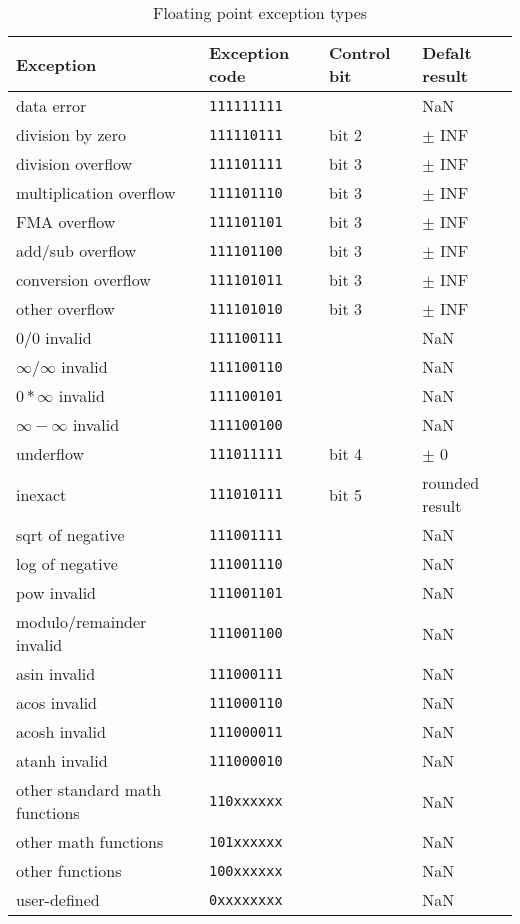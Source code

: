\documentclass[forwardcom.tex]{subfiles}
\begin{document}
\begin{longtable}
{|p{50mm}|p{28mm}|p{15mm}|p{26mm}|}
\caption{Floating point exception types}
\label{table:FPExceptionTypes}
\endfirsthead
\endhead
\hline
\bfseries Exception & \bfseries Exception code & \bfseries Control bit & \bfseries Defalt result \\ \hline

data error                & \texttt{111111111} &       &  NaN \\
division by zero          & \texttt{111110111} & bit 2 & $\pm$ INF \\
division overflow         & \texttt{111101111} & bit 3 & $\pm$ INF \\
multiplication overflow   & \texttt{111101110} & bit 3 & $\pm$ INF \\
FMA overflow              & \texttt{111101101} & bit 3 & $\pm$ INF \\
add/sub overflow          & \texttt{111101100} & bit 3 & $\pm$ INF \\
conversion overflow       & \texttt{111101011} & bit 3 & $\pm$ INF \\
other overflow            & \texttt{111101010} & bit 3 & $\pm$ INF \\
$0 / 0$ invalid           & \texttt{111100111} & & NaN \\
$\infty / \infty$ invalid & \texttt{111100110} & & NaN \\
$0 * \infty$ invalid      & \texttt{111100101} & & NaN \\
$\infty - \infty$ invalid & \texttt{111100100} & & NaN \\
underflow                 & \texttt{111011111} & bit 4 & $\pm$ 0 \\
inexact                   & \texttt{111010111} & bit 5 & rounded result \\
sqrt of negative          & \texttt{111001111} &  & NaN \\
log of negative           & \texttt{111001110} &  & NaN \\
pow invalid               & \texttt{111001101} &  & NaN \\
modulo/remainder invalid  & \texttt{111001100} &  & NaN \\
asin invalid              & \texttt{111000111} &  & NaN \\
acos invalid              & \texttt{111000110} &  & NaN \\
acosh invalid             & \texttt{111000011} &  & NaN \\
atanh invalid             & \texttt{111000010} &  & NaN \\

other standard math \newline functions  & \texttt{110xxxxxx} &  & NaN \\
other math functions      & \texttt{101xxxxxx} &  & NaN \\
other functions           & \texttt{100xxxxxx} &  & NaN \\
user-defined  & \texttt{0xxxxxxxx} &  & NaN \\
\hline
\end{longtable}
\vv
\end{document}

